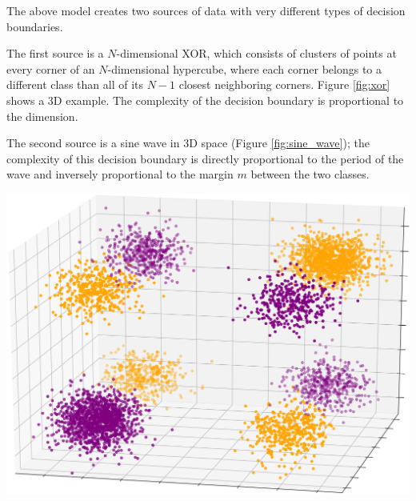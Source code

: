 \documentclass{article}
\begin{document}
The above model creates two sources of data with very different types of
decision boundaries.

The first source is a $N$-dimensional XOR, which consists of clusters of points
at every corner of an $N$-dimensional hypercube, where each corner belongs to a
different class than all of its $N-1$ closest neighboring corners. Figure
\ref{fig:xor} shows a 3D example. The complexity of the decision boundary is
proportional to the dimension.

The second source is a sine wave in 3D space (Figure \ref{fig:sine_wave}); the
complexity of this decision boundary is directly proportional to the period of
the wave and inversely proportional to the margin $m$ between the two classes.

\begin{minipage}{\textwidth}
\begin{minipage}{.48\textwidth}
    \centering
    \includegraphics[width=\textwidth]{xor_3d_square.png}
    \label{fig:xor}
\end{minipage}
\hspace{.04\textwidth}
\begin{minipage}{.48\textwidth}
    \centering

\end{minipage}
\end{minipage}
\end{document}

